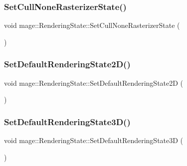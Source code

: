 \hypertarget{structmage_1_1_rendering_state_a4841e36e7be34f949da1d4088f217a1a}{}\label{structmage_1_1_rendering_state_a4841e36e7be34f949da1d4088f217a1a} 
\subsubsection{\texorpdfstring{Set\+Cull\+None\+Rasterizer\+State()}{SetCullNoneRasterizerState()}}
{\footnotesize\ttfamily void mage\+::\+Rendering\+State\+::\+Set\+Cull\+None\+Rasterizer\+State (\begin{DoxyParamCaption}{ }\end{DoxyParamCaption})}

\hypertarget{structmage_1_1_rendering_state_aa8279c1177941c8f14502fc9c7296655}{}\label{structmage_1_1_rendering_state_aa8279c1177941c8f14502fc9c7296655} 
\subsubsection{\texorpdfstring{Set\+Default\+Rendering\+State2\+D()}{SetDefaultRenderingState2D()}}
{\footnotesize\ttfamily void mage\+::\+Rendering\+State\+::\+Set\+Default\+Rendering\+State2D (\begin{DoxyParamCaption}{ }\end{DoxyParamCaption})}

\hypertarget{structmage_1_1_rendering_state_ac6029d9fdc873317b97f60d59b88e7a7}{}\label{structmage_1_1_rendering_state_ac6029d9fdc873317b97f60d59b88e7a7} 
\subsubsection{\texorpdfstring{Set\+Default\+Rendering\+State3\+D()}{SetDefaultRenderingState3D()}}
{\footnotesize\ttfamily void mage\+::\+Rendering\+State\+::\+Set\+Default\+Rendering\+State3D (\begin{DoxyParamCaption}{ }\end{DoxyParamCaption})}

